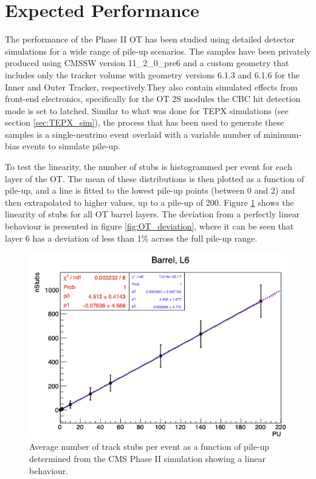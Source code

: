 \section{Expected Performance}

The performance of the Phase II OT has been studied using detailed detector simulations for a wide range of pile-up scenarios. The samples have been privately produced using CMSSW version 11\_2\_0\_pre6 and a custom geometry that includes only the tracker volume with geometry versions 6.1.3 and 6.1.6 for the Inner and Outer Tracker, respectively.They also contain simulated effects from front-end electronics, specifically for the OT 2S modules the CBC hit detection mode is set to latched. Similar to what was done for TEPX simulations (see section \ref{sec:TEPX_sim}), the process that has been used to generate these samples is a single-neutrino event overlaid with a variable number of minimum-bias events to simulate pile-up. 

To test the linearity, the number of stubs is histogrammed per event for each layer of the OT. The mean of these distributions is then plotted as a function of pile-up, and a line is fitted to the lowest pile-up points (between 0 and 2) and then extrapolated to higher values, up to a pile-up of 200. Figure \ref{fig:OT_linearity} shows the linearity of stubs for all OT barrel layers. The deviation from a perfectly linear behaviour is presented in figure \ref{fig:OT_deviation}, where it can be seen that layer 6 has a deviation of less than 1\% across the full pile-up range.

\begin{figure}[h!]
\centering
\includegraphics[width=.6\linewidth]{tex/Part2/fig/OT/OT-linearity.png}
\caption{
 Average number of track stubs per event as a function of pile-up determined from the CMS Phase II simulation showing a linear behaviour. 
} 
\label{fig:OT_linearity}
\end{figure}

